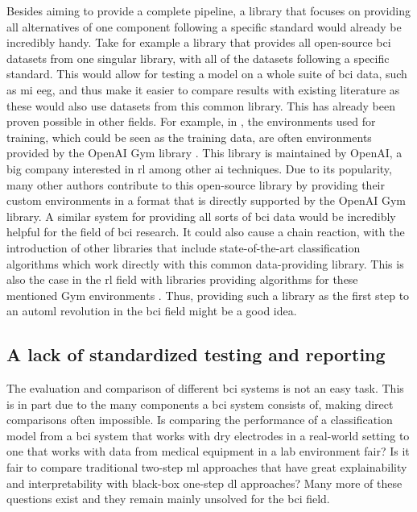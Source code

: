 Besides aiming to provide a complete pipeline, a library that focuses on providing all alternatives of one component following a specific standard would already be incredibly handy.
Take for example a library that provides all open-source \gls{bci} datasets from one singular library, with all of the datasets following a specific standard.
This would allow for testing a model on a whole suite of \gls{bci} data, such as \gls{mi} \gls{eeg}, and thus make it easier to compare results with existing literature as these would also use datasets from this common library.
This has already been proven possible in other fields.
For example, in , the environments used for training, which could be seen as the training data, are often environments provided by the OpenAI Gym library \citep{gym}.
This library is maintained by OpenAI, a big company interested in \gls{rl} among other \gls{ai} techniques.
Due to its popularity, many other authors contribute to this open-source library by providing their custom environments in a format that is directly supported by the OpenAI Gym library.
A similar system for providing all sorts of \gls{bci} data would be incredibly helpful for the field of \gls{bci} research.
It could also cause a chain reaction, with the introduction of other libraries that include state-of-the-art classification algorithms which work directly with this common data-providing library.
This is also the case in the \gls{rl} field with libraries providing algorithms for these mentioned Gym environments \citep{tianshou, rllib}.
Thus, providing such a library as the first step to an \gls{automl} revolution in the \gls{bci} field might be a good idea.





\subsection{A lack of standardized testing and reporting}
\label{subsec:bci_opportunities_obstacles_lack_of_testing}

The evaluation and comparison of different \gls{bci} systems is not an easy task.
This is in part due to the many components a \gls{bci} system consists of, making direct comparisons often impossible.
Is comparing the performance of a classification model from a \gls{bci} system that works with dry electrodes in a real-world setting to one that works with data from medical equipment in a lab environment fair?
Is it fair to compare traditional two-step \gls{ml} approaches that have great explainability and interpretability with black-box one-step \gls{dl} approaches?
Many more of these questions exist and they remain mainly unsolved for the \gls{bci} field.

